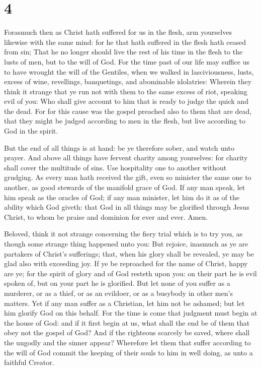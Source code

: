 \hypertarget{section-3}{%
\section{4}\label{section-3}}

 Forasmuch then as Christ hath suffered for us in the
flesh, arm yourselves likewise with the same mind: for he that hath
suffered in the flesh hath ceased from sin;  That he no
longer should live the rest of his time in the flesh to the lusts of
men, but to the will of God.  For the time past of our
life may suffice us to have wrought the will of the Gentiles, when we
walked in lasciviousness, lusts, excess of wine, revellings,
banquetings, and abominable idolatries:  Wherein they
think it strange that ye run not with them to the same excess of riot,
speaking evil of you:  Who shall give account to him that
is ready to judge the quick and the dead.  For for this
cause was the gospel preached also to them that are dead, that they
might be judged according to men in the flesh, but live according to God
in the spirit.

 But the end of all things is at hand: be ye therefore
sober, and watch unto prayer.  And above all things have
fervent charity among yourselves: for charity shall cover the multitude
of sins.  Use hospitality one to another without grudging.
 As every man hath received the gift, even so minister
the same one to another, as good stewards of the manifold grace of God.
 If any man speak, let him speak as the oracles of God;
if any man minister, let him do it as of the ability which God giveth:
that God in all things may be glorified through Jesus Christ, to whom be
praise and dominion for ever and ever. Amen.

 Beloved, think it not strange concerning the fiery trial
which is to try you, as though some strange thing happened unto you:
 But rejoice, inasmuch as ye are partakers of Christ's
sufferings; that, when his glory shall be revealed, ye may be glad also
with exceeding joy.  If ye be reproached for the name of
Christ, happy are ye; for the spirit of glory and of God resteth upon
you: on their part he is evil spoken of, but on your part he is
glorified.  But let none of you suffer as a murderer, or
as a thief, or as an evildoer, or as a busybody in other men's matters.
 Yet if any man suffer as a Christian, let him not be
ashamed; but let him glorify God on this behalf.  For the
time is come that judgment must begin at the house of God: and if it
first begin at us, what shall the end be of them that obey not the
gospel of God?  And if the righteous scarcely be saved,
where shall the ungodly and the sinner appear?  Wherefore
let them that suffer according to the will of God commit the keeping of
their souls to him in well doing, as unto a faithful Creator.

